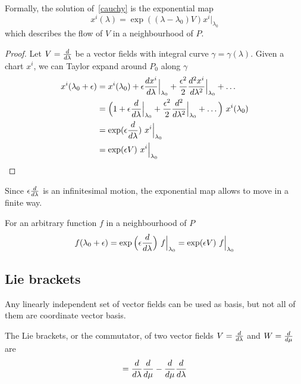     Formally, the solution of~\eqref{cauchy} is the exponential map
    \begin{equation*}
        x^i(\lambda) = \exp((\lambda - \lambda_0)V) x^i \Big\vert_{\lambda_0}
    \end{equation*}
    which describes the flow of $V$ in a neighbourhood of $P$. 

    \begin{proof}
        Let $V = \frac{d}{d\lambda}$ be a vector fields with integral curve $\gamma = \gamma (\lambda)$. Given a chart $x^i$, we can Taylor expand around $P_0$ along $\gamma$
        \begin{equation*}
        \begin{aligned}
            x^i(\lambda_0 + \epsilon) & = x^i(\lambda_0) + \epsilon \frac{dx^i}{d\lambda} \Big\vert_{\lambda_0} + \frac{\epsilon^2}{2} \frac{d^2x^i}{d\lambda^2} \Big\vert_{\lambda_0} + \ldots \\ & = \Big (1 + \epsilon \frac{d}{d\lambda} \Big\vert_{\lambda_0} + \frac{\epsilon^2}{2} \frac{d^2}{d\lambda^2} \Big\vert_{\lambda_0} + \ldots \Big) ~ x^i(\lambda_0) \\ & = \exp(\epsilon \frac{d}{d\lambda}) ~ x^i \Big\vert_{\lambda_0} \\ & = \exp(\epsilon V) ~ x^i \Big\vert_{\lambda_0} 
        \end{aligned}
        \end{equation*}
    \end{proof}
    \noindent Since $\epsilon \frac{d}{d\lambda}$ is an infinitesimal motion, the exponential map allows to move in a finite way.
    
    For an arbitrary function $f$ in a neighbourhood of $P$
    \begin{equation*}
        f(\lambda_0 + \epsilon) = \exp \Big(\epsilon \frac{d}{d\lambda} \Big) ~ f \Big\vert_{\lambda_0} = \exp (\epsilon V ) ~ f \Big\vert_{\lambda_0}
    \end{equation*}

\subsection{Lie brackets}

    Any linearly independent set of vector fields can be used as basis, but not all of them are coordinate vector basis. 

    \begin{definition}
        The Lie brackets, or the commutator, of two vector fields $V = \frac{d}{d\lambda}$ and $W=\frac{d}{d\mu}$ are 
        \begin{equation*}
            [V, W] = \dv{}{\lambda} \dv{}{\mu} - \dv{}{\mu} \dv{}{\lambda}
        \end{equation*}
    \end{definition}

